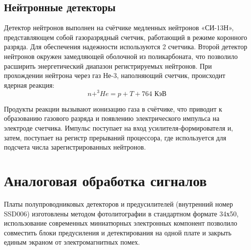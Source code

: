 



\subsection{Нейтронные детекторы}

Детектор нейтронов выполнен на счётчике медленных нейтронов «СИ-13Н», представляющем собой газоразрядный  счетчик, работающий в режиме коронного разряда. Для обеспечения надежности используются 2 счетчика. Второй детектор нейтронов окружен замедляющей оболочной из поликарбоната, что позволило расширить энергетический диапазон регистрируемых нейтронов. При прохождении нейтрона через газ Не-3, наполняющий счетчик, происходит ядерная реакция:
\[ n+^3\!He = p+T+764 \textrm{ КэВ}\]

Продукты реакции вызывают ионизацию газа в счётчике, что приводит к образованию газового разряда и появлению электрического импульса на электроде счетчика. Импульс поступает на вход усилителя-формирователя и, затем, поступает на регистр прерываний процессора, где используется для подсчета числа зарегистрированных нейтронов.
\cite{Shavrin2002}


\section{Аналоговая обработка сигналов}

Платы полупроводниковых детекторов и предусилителей (внутренний номер SSD006) изготовлены методом фотолитографии в стандартном формате 34х50, использование современных миниатюрных электронных компонент позволило совместить блоки предусиления и детектирования на одной плате и закрыть единым экраном от электромагнитных помех.

